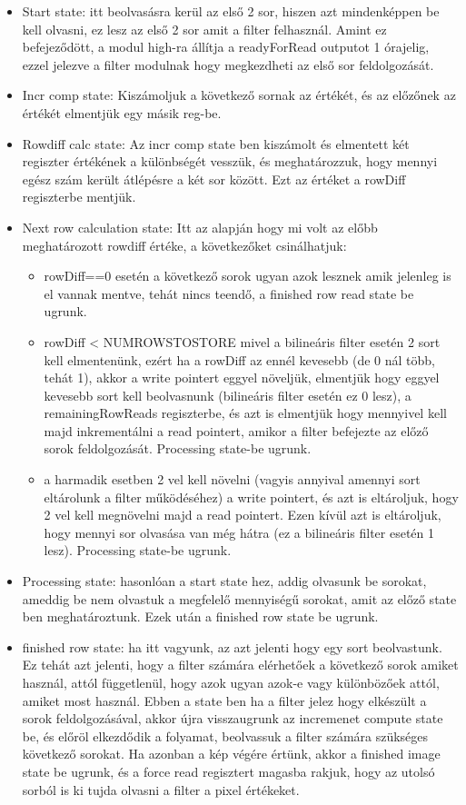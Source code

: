 \begin{itemize}
	\item Start state: itt beolvasásra kerül az első 2 sor, hiszen azt mindenképpen be kell olvasni, ez lesz az első 2 sor amit a filter felhasznál. Amint ez befejeződött, a modul high-ra állítja a readyForRead outputot 1 órajelig, ezzel jelezve a filter modulnak hogy megkezdheti az első sor feldolgozását.
	\item Incr comp state: Kiszámoljuk a következő sornak az értékét, és az előzőnek az értékét elmentjük egy másik reg-be.
	\item Rowdiff calc state: Az incr comp state ben kiszámolt és elmentett két regiszter értékének a különbségét vesszük, és meghatározzuk, hogy mennyi egész szám került átlépésre a két sor között. Ezt az értéket a rowDiff regiszterbe mentjük.
	\item Next row calculation state: Itt az alapján hogy mi volt az előbb meghatározott rowdiff értéke, a következőket csinálhatjuk:
	\begin{itemize}
		\item rowDiff==0 esetén a következő sorok ugyan azok lesznek amik jelenleg is el vannak mentve, tehát nincs teendő, a finished row read state be ugrunk.
		\item rowDiff < NUMROWSTOSTORE mivel a bilineáris filter esetén 2 sort kell elmentenünk, ezért ha a rowDiff az ennél kevesebb (de 0 nál több, tehát 1), akkor a write pointert  eggyel növeljük, elmentjük hogy eggyel kevesebb sort kell beolvasnunk (bilineáris filter esetén ez 0 lesz), a remainingRowReads regiszterbe, és azt is elmentjük hogy mennyivel kell majd inkrementálni a read pointert, amikor a filter befejezte az előző sorok feldolgozását. Processing state-be ugrunk.
		\item a harmadik esetben 2 vel kell növelni (vagyis annyival amennyi sort eltárolunk a filter működéséhez) a write pointert, és azt is eltároljuk, hogy 2 vel kell megnövelni majd a read pointert. Ezen kívül azt is eltároljuk, hogy mennyi sor olvasása van még hátra (ez a bilineáris filter esetén 1 lesz). Processing state-be ugrunk.
	\end{itemize}
	\item Processing state: hasonlóan a start state hez, addig olvasunk be sorokat, ameddig be nem olvastuk a megfelelő mennyiségű sorokat, amit az előző state ben meghatároztunk. Ezek után a finished row state be ugrunk.
	\item finished row state: ha itt vagyunk, az azt jelenti hogy egy sort beolvastunk. Ez tehát azt jelenti, hogy a filter számára elérhetőek a következő sorok amiket használ, attól függetlenül, hogy azok ugyan azok-e vagy különbözőek attól, amiket most használ. Ebben a state ben ha a filter jelez hogy elkészült a sorok feldolgozásával, akkor újra visszaugrunk az incremenet compute state be, és előröl elkezdődik a folyamat, beolvassuk a filter számára szükséges következő sorokat. Ha azonban a kép végére értünk, akkor a finished image state be ugrunk, és a force read regisztert magasba rakjuk, hogy az utolsó sorból is ki tujda olvasni a filter a pixel értékeket.

\end{itemize}
